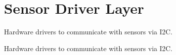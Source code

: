 \hypertarget{group___d_r_i_v_e_r_s}{}\section{Sensor Driver Layer}
\label{group___d_r_i_v_e_r_s}


Hardware drivers to communicate with sensors via I2\+C.  


Hardware drivers to communicate with sensors via I2\+C. 

